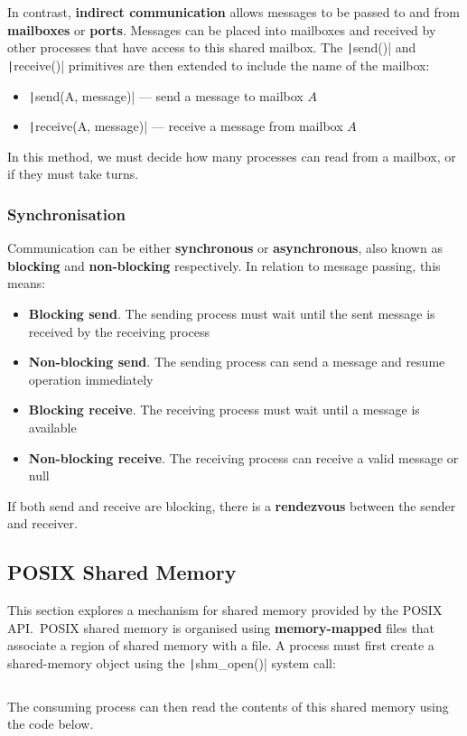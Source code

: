 \documentclass{article}
\begin{document}
In contrast, \textbf{indirect communication} allows messages to be
passed to and from \textbf{mailboxes} or \textbf{ports}. Messages can
be placed into mailboxes and received by other processes that have
access to this shared mailbox. The \texttt|send()| and
\texttt|receive()| primitives are then extended to include
the name of the mailbox:
\begin{itemize}
    \item \texttt|send(A, message)| --- send a message to
          mailbox \(A\)
    \item \texttt|receive(A, message)| --- receive a message
          from mailbox \(A\)
\end{itemize}
In this method, we must decide how many processes can read from a
mailbox, or if they must take turns.
\subsubsection{Synchronisation}
Communication can be either \textbf{synchronous} or
\textbf{asynchronous}, also known as \textbf{blocking} and
\textbf{non-blocking} respectively. In relation to message passing,
this means:
\begin{itemize}
    \item \textbf{Blocking send}. The sending process must wait until
          the sent message is received by the receiving process
    \item \textbf{Non-blocking send}. The sending process can send a
          message and resume operation immediately
    \item \textbf{Blocking receive}. The receiving process must wait
          until a message is available
    \item \textbf{Non-blocking receive}. The receiving process can
          receive a valid message or null
\end{itemize}
If both send and receive are blocking, there is a \textbf{rendezvous}
between the sender and receiver.
\subsection{POSIX Shared Memory}
This section explores a mechanism for shared memory provided by the
POSIX API.\ POSIX shared memory is organised using
\textbf{memory-mapped} files that associate a region of shared memory
with a file. A process must first create a shared-memory object using
the \texttt|shm_open()| system call:
\inputminted{c}{code/posix_shared_memory_producer.c} The consuming
process can then read the contents of this shared memory using the code
below.\ \inputminted{c}{code/posix_shared_memory_consumer.c}
\end{document}
